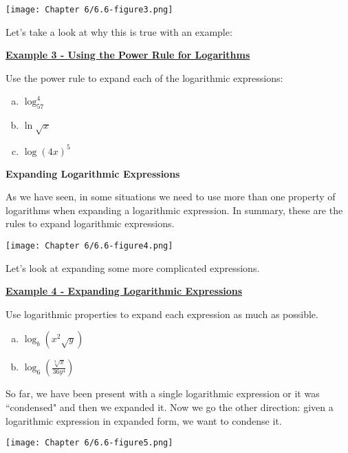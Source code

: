 \documentclass[12pt]{book}
\newcommand{\D}{\displaystyle}
\begin{document}
\centerline{\texttt{[image: Chapter 6/6.6-figure3.png]}}
Let's take a look at why this is true with an example:

\vspace{50mm}

\underline{\textbf{Example 3 - Using the Power Rule for Logarithms}}

Use the power rule to expand each of the logarithmic expressions:
\begin{multicols}{3}
    \begin{enumerate}[(a)]
    \item $\D \log_57^4$
    \item $\D \ln \sqrt{x}$
    \item $\D \log(4x)^5$
\end{enumerate}
\end{multicols}


\newpage

\textbf{{\large Expanding Logarithmic Expressions}}

As we have seen, in some situations we need to use more than one property of logarithms when expanding a logarithmic expression. In summary, these are the rules to expand logarithmic expressions.

\centerline{\texttt{[image: Chapter 6/6.6-figure4.png]}}

\vspace{5mm}

Let's look at expanding some more complicated expressions. 

\underline{\textbf{Example 4 - Expanding Logarithmic Expressions}}

Use logarithmic properties to expand each expression as much as possible.
\begin{multicols}{2}
    \begin{enumerate}[(a)]
    \item $\D \log_b(x^2\sqrt{y})$
    \item $\D \log_6\left(\frac{\sqrt[3]{x}}{36y^4}\right)$
\end{enumerate}
\end{multicols}


\newpage
So far, we have been present with a single logarithmic expression or it was ``condensed" and then we expanded it. Now we go the other direction: given a logarithmic expression in expanded form, we want to condense it. 
\vspace{2mm}

\centerline{\texttt{[image: Chapter 6/6.6-figure5.png]}}
\vspace{5mm}
\end{document}
